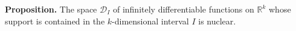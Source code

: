 \textbf{Proposition.} The space $\mathcal{D}_I$ of infinitely differentiable functions on $\mathbb{R}^k$ whose support is contained in the $k$-dimensional interval $I$ is nuclear.
